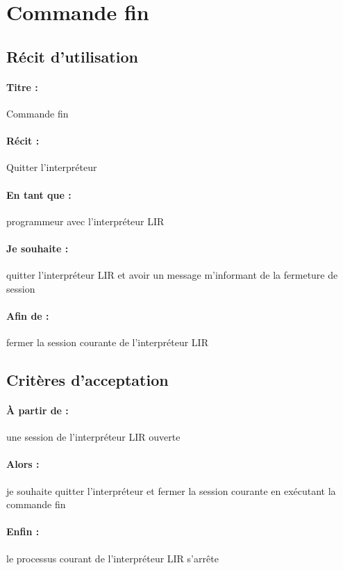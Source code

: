     \section{Commande fin}

    \subsection*{Récit d'utilisation}

    \paragraph{Titre : } Commande fin
    \paragraph{Récit : } Quitter l'interpréteur
    \paragraph{En tant que : } programmeur avec l'interpréteur LIR
    \paragraph{Je souhaite : } quitter l'interpréteur LIR et avoir un message
                               m'informant de la fermeture de session
    \paragraph{Afin de : } fermer la session courante de l'interpréteur LIR

    \subsection*{Critères d'acceptation}

    \paragraph{À partir de : } une session de l'interpréteur LIR ouverte
    \paragraph{Alors : } je souhaite quitter l'interpréteur et fermer la session
                         courante en exécutant la commande fin
    \paragraph{Enfin : } le processus courant de l'interpréteur LIR s'arrête